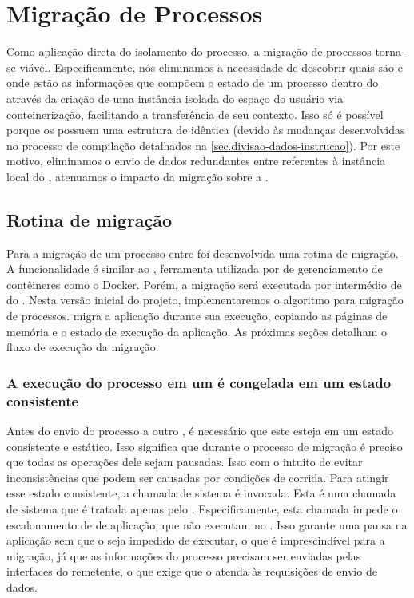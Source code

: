 \section{Migração de Processos}
\label{sec.migracao}

Como aplicação direta do isolamento do processo, a migração de processos torna-se viável. Especificamente, nós eliminamos a necessidade de descobrir quais são e onde estão as informações que compõem o estado de um processo dentro do \nanvix através da criação de uma instância isolada do espaço do usuário via conteinerização, facilitando a transferência de seu contexto. Isso só é possível porque os \clusters possuem uma estrutura de  idêntica (devido às mudanças desenvolvidas no processo de compilação detalhados na \autoref{sec.divisao-dados-instrucao}). Por este motivo, eliminamos o envio de dados redundantes entre \clusters referentes à instância local do \os, atenuamos o impacto da migração sobre a \noc.

\subsection{Rotina de migração}
\label{sec.rotina-migracao}

Para a migração de um processo entre \clusters foi desenvolvida uma rotina de migração. A funcionalidade é similar ao \criu, ferramenta utilizada por \softwares de gerenciamento de contêineres como o Docker. Porém, a migração será executada por intermédio de \daemons do \os. Nesta versão inicial do projeto, implementaremos o algoritmo \hotmigration para migração de processos. \hotmigration migra a aplicação durante sua execução, copiando as páginas de memória e o estado de execução da aplicação.
As próximas seções detalham o fluxo de execução da migração.

\subsubsection{A execução do processo em um \cluster é congelada em um estado consistente}

    Antes do envio do processo a outro \cluster, é necessário que este esteja em um estado consistente e estático. Isso significa que durante o processo de migração é preciso que todas as operações dele sejam pausadas. Isso com o intuito de evitar inconsistências que podem ser causadas por condições de corrida. Para atingir esse estado consistente, a chamada de sistema \freeze é invocada. Esta é uma chamada de sistema que é tratada apenas pelo \mcore. Especificamente, esta chamada impede o escalonamento de \threads de aplicação, \ie \threads que não executam no \mcore. Isso garante uma pausa na aplicação sem que o \so seja impedido de executar, o que é imprescindível para a migração, já que as informações do processo precisam ser enviadas pelas interfaces \noc do \cluster remetente, o que exige que o \so atenda às requisições de envio de dados.

